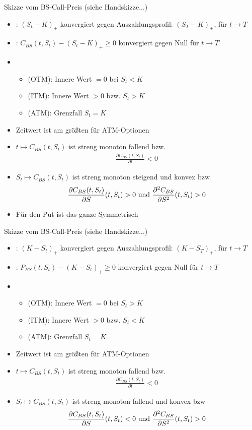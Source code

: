 Skizze vom BS-Call-Preis (siehe Handskizze...)
\begin{itemize}
	\item {}: $(S_t -K)_+$ konvergiert gegen Auszahlungsprofil: $(S_T - K)_+$, für $t \to T$
	\item {}: $C_{BS}(t,S_t) - (S_t - K)_+ \ge 0$ konvergiert gegen Null für $t \to T$
	\item 
	\begin{itemize}
		\item {} (OTM): Innere Wert $=0$ bei $S_t < K$
		\item {} (ITM): Innere Wert $>0$ bzw. $S_t > K$
		\item {} (ATM): Grenzfall $S_t = K$
	\end{itemize}
	\item Zeitwert ist am größten für ATM-Optionen
	\item $t \mapsto C_{BS}(t,S_t)$ ist streng monoton fallend bzw.
	\begin{align*}
		\frac{\partial C_{BS}(t,S_t)}{\partial t} < 0
	\end{align*}
	\item $S_t \mapsto C_{BS}(t,S_t)$ ist streng monoton steigend und konvex bzw
	\begin{align*}
		\frac{\partial C_{BS}(t,S_t)}{\partial S}(t,S_t) > 0 \text{ und } \frac{\partial^2 C_{BS}}{\partial S^2}(t,S_t) > 0
	\end{align*}
	\item Für den Put ist das ganze Symmetrisch
\end{itemize}
Skizze vom BS-Call-Preis (siehe Handskizze...)
\begin{itemize}
	\item {}: $(K -S_t)_+$ konvergiert gegen Auszahlungsprofil: $(K - S_T)_+$, für $t \to T$
	\item {}: $P_{BS}(t,S_t) - (K - S_t)_+ \ge 0$ konvergiert gegen Null für $t \to T$
	\item 
	\begin{itemize}
		\item {} (OTM): Innere Wert $=0$ bei $S_t > K$
		\item {} (ITM): Innere Wert $>0$ bzw. $S_t < K$
		\item {} (ATM): Grenzfall $S_t = K$
	\end{itemize}
	\item Zeitwert ist am größten für ATM-Optionen
	\item $t \mapsto C_{BS}(t,S_t)$ ist streng monoton fallend bzw.
	\begin{align*}
	\frac{\partial C_{BS}(t,S_t)}{\partial t} < 0
	\end{align*}
	\item $S_t \mapsto C_{BS}(t,S_t)$ ist streng monoton fallend und konvex bzw
	\begin{align*}
	\frac{\partial C_{BS}(t,S_t)}{\partial S}(t,S_t) < 0 \text{ und } \frac{\partial^2 C_{BS}}{\partial S^2}(t,S_t) > 0
	\end{align*}
\end{itemize}
